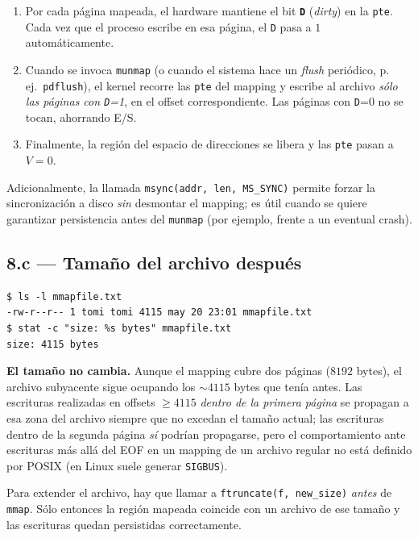 \documentclass[11pt,a4paper]{article}
\begin{document}
\begin{enumerate}[leftmargin=*]
    \item Por cada página mapeada, el hardware mantiene el bit
        \textbf{\texttt{D}} (\emph{dirty}) en la \texttt{pte}. Cada
        vez que el proceso escribe en esa página, el \texttt{D} pasa
        a $1$ automáticamente.
    \item Cuando se invoca \texttt{munmap} (o cuando el sistema hace
        un \emph{flush} periódico, p.\,ej.\ \texttt{pdflush}), el
        kernel recorre las \texttt{pte} del mapping y escribe al
        archivo \emph{sólo las páginas con \texttt{D}=1}, en el
        offset correspondiente. Las páginas con \texttt{D}=0 no se
        tocan, ahorrando E/S.
    \item Finalmente, la región del espacio de direcciones se libera
        y las \texttt{pte} pasan a $V=0$.
\end{enumerate}

Adicionalmente, la llamada \texttt{msync(addr, len, MS\_SYNC)} permite
forzar la sincronización a disco \emph{sin} desmontar el mapping; es
útil cuando se quiere garantizar persistencia antes del \texttt{munmap}
(por ejemplo, frente a un eventual crash).

\subsection{8.c --- Tamaño del archivo después}

\begin{lstlisting}[style=shellstyle]
$ ls -l mmapfile.txt
-rw-r--r-- 1 tomi tomi 4115 may 20 23:01 mmapfile.txt
$ stat -c "size: %s bytes" mmapfile.txt
size: 4115 bytes
\end{lstlisting}

\textbf{El tamaño no cambia.} Aunque el mapping cubre dos páginas
($8192$ bytes), el archivo subyacente sigue ocupando los $\sim 4115$
bytes que tenía antes. Las escrituras realizadas en offsets
$\geq 4115$ \emph{dentro de la primera página} se propagan a esa
zona del archivo siempre que no excedan el tamaño actual; las
escrituras dentro de la segunda página \emph{sí} podrían propagarse,
pero el comportamiento ante escrituras más allá del EOF en un mapping
de un archivo regular no está definido por POSIX (en Linux suele
generar \texttt{SIGBUS}).

\begin{importante}
Para extender el archivo, hay que llamar a \texttt{ftruncate(f,
new\_size)} \emph{antes} de \texttt{mmap}. Sólo entonces la región
mapeada coincide con un archivo de ese tamaño y las escrituras quedan
persistidas correctamente.
\end{importante}
\end{document}
